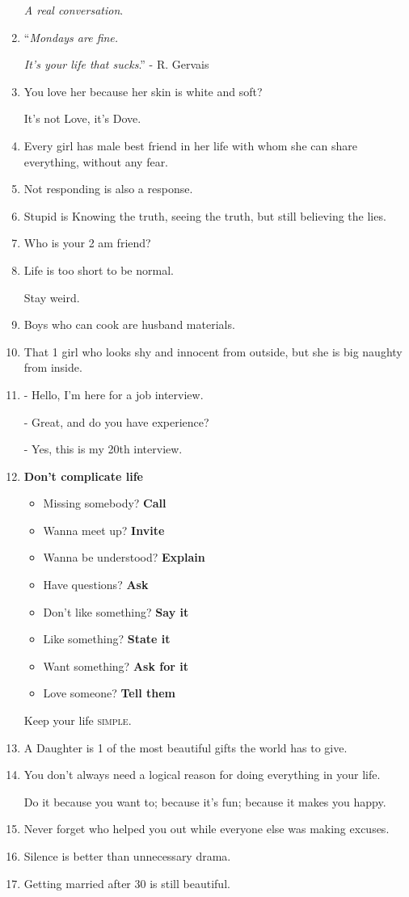 \documentclass{article}
\begin{document}
\begin{enumerate}
	\textit{A real conversation}.
	\item ``\textit{Mondays are fine.}
	
	\textit{It's your life that sucks}.'' - R. Gervais
	\item You love her because her skin is white and soft?
	
	It's not Love, it's Dove.
	\item Every girl has male best friend in her life with whom she can share everything, without any fear.
	\item Not responding is also a response.
	\item Stupid is Knowing the truth, seeing the truth, but still believing the lies.
	\item Who is your 2 am friend?
	\item Life is too short to be normal.
	
	Stay weird.
	\item Boys who can cook are husband materials.
	\item That 1 girl who looks shy and innocent from outside, but she is big naughty from inside.
	\item - Hello, I'm here for a job interview.
	
	- Great, and do you have experience?
	
	- Yes, this is my 20th interview.
	\item \textbf{Don't complicate life}
	\begin{itemize}
		\item Missing somebody? \textbf{Call}
		\item Wanna meet up? \textbf{Invite}
		\item Wanna be understood? \textbf{Explain}
		\item Have questions? \textbf{Ask}
		\item Don't like something? \textbf{Say it}
		\item Like something? \textbf{State it}
		\item Want something? \textbf{Ask for it}
		\item Love someone? \textbf{Tell them}
	\end{itemize}
	Keep your life \textsc{simple}.
	\item A Daughter is 1 of the most beautiful gifts the world has to give.
	\item You don't always need a logical reason for doing everything in your life.
	
	Do it because you want to; because it's fun; because it makes you happy.
	\item Never forget who helped you out while everyone else was making excuses.
	\item Silence is better than unnecessary drama.
	\item Getting married after 30 is still beautiful.
	

\end{enumerate}
\end{document}

